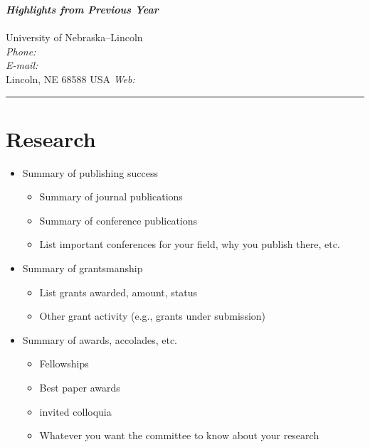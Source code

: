 \documentclass[11pt]{article}
\providecommand*\email[1]{\href{mailto:#1}{#1}}
\newcommand\CVheading[1]{{\Large \bf \UNLname{} \hfill \textit{#1}}\\
  \UNLrank{}\\
  University of Nebraska--Lincoln\\
  \UNLdept{}\hfill \textit{Phone:} \UNLphone{}\\
  \UNLaddress{}\hfill  \textit{E-mail:} \email{\UNLemail{}}\\
  Lincoln, NE 68588 USA \hfill \textit{Web:} \UNLwebsite{}\vspace{-5pt}
  \rule{\columnwidth}{2pt}}
\begin{document}
\CVheading{Highlights from Previous Year}

\section{Research}

\begin{itemize}
\item Summary of publishing success
  \begin{itemize}
  \item Summary of journal publications
  \item Summary of conference publications
  \item List important conferences for your field, why you publish there, etc.
  \end{itemize}
\item Summary of grantsmanship
  \begin{itemize}
  \item List grants awarded, amount, status
  \item Other grant activity (e.g., grants under submission)
  \end{itemize}
\item Summary of awards, accolades, etc.
  \begin{itemize}
  \item Fellowships
  \item Best paper awards
  \item invited colloquia
  \item Whatever you want the committee to know about your research
  \end{itemize}
\end{itemize}

\end{document}
